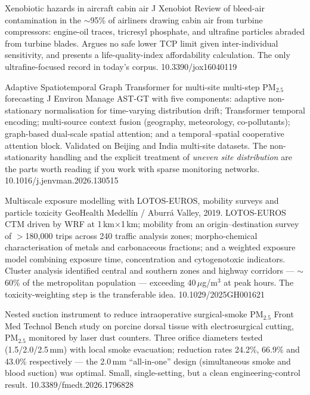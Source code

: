 \documentclass[10pt]{article}
\begin{document}
{Xenobiotic hazards in aircraft cabin air}
{J Xenobiot}
{Review of bleed-air contamination in the $\sim$95\% of airliners drawing cabin air from
turbine compressors: engine-oil traces, tricresyl phosphate, and ultrafine particles
abraded from turbine blades. Argues no safe lower TCP limit given inter-individual
sensitivity, and presents a life-quality-index affordability calculation.
The only ultrafine-focused record in today's corpus.}
{10.3390/jox16040119}

\clearpage


{Adaptive Spatiotemporal Graph Transformer for multi-site multi-step PM$_{2.5}$ forecasting}
{J Environ Manage}
{AST-GT with five components: adaptive non-stationary normalisation for time-varying
distribution drift; Transformer temporal encoding; multi-source context fusion
(geography, meteorology, co-pollutants); graph-based dual-scale spatial attention; and a
temporal--spatial cooperative attention block. Validated on Beijing and India multi-site
datasets. The non-stationarity handling and the explicit treatment of \emph{uneven site
distribution} are the parts worth reading if you work with sparse monitoring networks.}
{10.1016/j.jenvman.2026.130515}

{Multiscale exposure modelling with LOTOS-EUROS, mobility surveys and particle toxicity}
{GeoHealth}
{Medell\'in / Aburr\'a Valley, 2019. LOTOS-EUROS CTM driven by WRF at
1\,km$\times$1\,km; mobility from an origin--destination survey of $>$180{,}000 trips across
240 traffic analysis zones; morpho-chemical characterisation of metals and carbonaceous
fractions; and a weighted exposure model combining exposure time, concentration and
cytogenotoxic indicators. Cluster analysis identified central and southern zones and
highway corridors --- $\sim$60\% of the metropolitan population --- exceeding
40\,$\mu$g/m$^3$ at peak hours. The toxicity-weighting step is the transferable idea.}
{10.1029/2025GH001621}

{Nested suction instrument to reduce intraoperative surgical-smoke PM$_{2.5}$}
{Front Med Technol}
{Bench study on porcine dorsal tissue with electrosurgical cutting, PM$_{2.5}$ monitored
by laser dust counters. Three orifice diameters tested (1.5/2.0/2.5\,mm) with local smoke
evacuation; reduction rates 24.2\%, 66.9\% and 43.0\% respectively --- the 2.0\,mm
``all-in-one'' design (simultaneous smoke and blood suction) was optimal. Small,
single-setting, but a clean engineering-control result.}
{10.3389/fmedt.2026.1796828}
\end{document}
